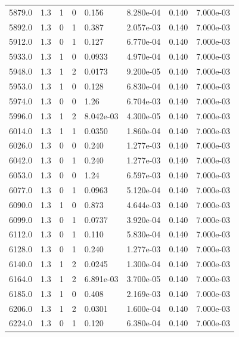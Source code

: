 \documentclass[preview]{standalone}
\begin{document}
{{{{{{{{{{{\begin{tabular}{L{1.2cm}C{1.2cm} C{0.3cm}C{0.5cm} C{1.4cm}C{1.4cm} C{1.4cm}C{1.4cm}}
  5879.0  &   1.3  & 1     &  0 &  0.156  & 8.280e-04  & 0.140 &  7.000e-03   \\ 
  5892.0  &   1.3  & 0     &  1 &  0.387  & 2.057e-03  & 0.140 &  7.000e-03   \\ 
  5912.0  &   1.3  & 0     &  1 &  0.127  & 6.770e-04  & 0.140 &  7.000e-03   \\ 
  5933.0  &   1.3  & 1     &  0 &  0.0933  & 4.970e-04  & 0.140 &  7.000e-03   \\ 
  5948.0  &   1.3  & 1     &  2 &  0.0173  & 9.200e-05  & 0.140 &  7.000e-03   \\ 
  5953.0  &   1.3  & 1     &  0 &  0.128  & 6.830e-04  & 0.140 &  7.000e-03   \\ 
  5974.0  &   1.3  & 0     &  0 &  1.26  & 6.704e-03  & 0.140 &  7.000e-03   \\ 
  5996.0  &   1.3  & 1     &  2 &  8.042e-03  & 4.300e-05  & 0.140 &  7.000e-03   \\ 
  6014.0  &   1.3  & 1     &  1 &  0.0350  & 1.860e-04  & 0.140 &  7.000e-03   \\ 
  6026.0  &   1.3  & 0     &  0 &  0.240  & 1.277e-03  & 0.140 &  7.000e-03   \\ 
  6042.0  &   1.3  & 0     &  1 &  0.240  & 1.277e-03  & 0.140 &  7.000e-03   \\ 
  6053.0  &   1.3  & 0     &  0 &  1.24  & 6.597e-03  & 0.140 &  7.000e-03   \\ 
  6077.0  &   1.3  & 0     &  1 &  0.0963  & 5.120e-04  & 0.140 &  7.000e-03   \\ 
  6090.0  &   1.3  & 1     &  0 &  0.873  & 4.644e-03  & 0.140 &  7.000e-03   \\ 
  6099.0  &   1.3  & 0     &  1 &  0.0737  & 3.920e-04  & 0.140 &  7.000e-03   \\ 
  6112.0  &   1.3  & 0     &  1 &  0.110  & 5.830e-04  & 0.140 &  7.000e-03   \\ 
  6128.0  &   1.3  & 0     &  1 &  0.240  & 1.277e-03  & 0.140 &  7.000e-03   \\ 
  6140.0  &   1.3  & 1     &  2 &  0.0245  & 1.300e-04  & 0.140 &  7.000e-03   \\ 
  6164.0  &   1.3  & 1     &  2 &  6.891e-03  & 3.700e-05  & 0.140 &  7.000e-03   \\ 
  6185.0  &   1.3  & 1     &  0 &  0.408  & 2.169e-03  & 0.140 &  7.000e-03   \\ 
  6206.0  &   1.3  & 1     &  2 &  0.0301  & 1.600e-04  & 0.140 &  7.000e-03   \\ 
  6224.0  &   1.3  & 0     &  1 &  0.120  & 6.380e-04  & 0.140 &  7.000e-03   \\ 

\end{tabular}}}}}}}}}}}}
\end{document}
